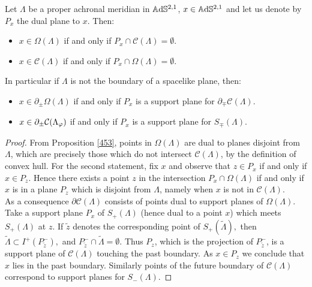 \begin{proposition}\label{464}
Let $\Lambda$ be a proper achronal meridian in $\mathbb{A}\mathrm{d}\mathbb{S}^{2,1}$, $x\in\mathbb{A}\mathrm{d}\mathbb{S}^{2,1}$ and let us denote by $P_x$ the dual plane to $x$. Then: 
\begin{itemize}
    \item $x\in\Omega(\Lambda)$ if and only if $P_x\cap\mathcal{C}(\Lambda)=\emptyset$. 
    \item $x\in\mathcal{C}(\Lambda)$ if and only if $P_x\cap \Omega(\Lambda)=\emptyset$.
\end{itemize} 
In particular if $\Lambda$ is not the boundary of a spacelike plane, then: 
\begin{itemize}
    \item $x\in\partial_\pm\Omega(\Lambda)$ if and only if $P_x$ is a support plane for $\partial_\mp\mathcal{C}(\Lambda).$
    \item $x\in\partial_\pm\mathcal{C}(\Lambda_\varphi)$ if and only if $P_x$ is a support plane for $S_\mp(\Lambda)$.
\end{itemize}
\end{proposition}
\begin{proof}
From Proposition \ref{453}, points in $\Omega(\Lambda)$ are dual to planes disjoint from $\Lambda$, which are precisely those which do not intersect $\mathcal{C}(\Lambda)$, by the definition of convex hull. For the second statement, fix $x$ and observe that $z\in P_x$ if and only if $x\in P_z$. Hence there exists a point $z$ in the intersection $P_x\cap \Omega(\Lambda)$ if and only if $x$ is in a plane $P_z$ which is disjoint from $\Lambda$, namely when $x$ is not in $\mathcal{C}(\Lambda)$. \\
As a consequence $\partial\mathcal{C}(\Lambda)$ consists of points dual to support planes of $\Omega(\Lambda)$. Take a support plane $P_x$ of $S_+(\Lambda)$ (hence dual to a point $x$) which meets $S_+(\Lambda)$ at $z$. If $\widetilde{z}$ denotes the corresponding point of $S_+(\widetilde{\Lambda}),$ then $\widetilde{\Lambda}\subset I^+(P_{\widetilde{z}}^-),$ and $P_{\widetilde{z}}^-\cap\widetilde{\Lambda}=\emptyset.$ Thus $P_z$, which is the projection of $P_{\widetilde{z}}^-$, is a support plane of $\mathcal{C}(\Lambda)$ touching the past boundary. As $x\in P_z$ we conclude that $x$ lies in the past boundary. Similarly points of the future boundary of $\mathcal{C}(\Lambda)$ correspond to support planes for $S_-(\Lambda)$.
\end{proof}

